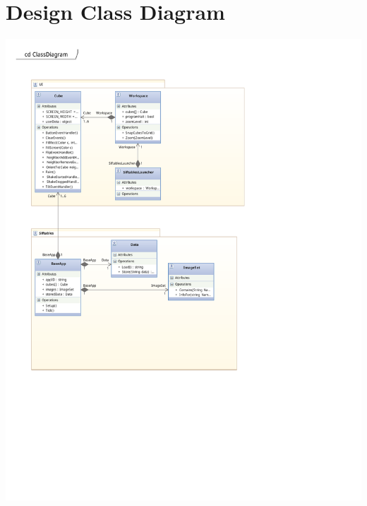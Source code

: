 \documentclass[12pt]{article}
\begin{document}
\section{Design Class Diagram}
\begin{center}
        \includegraphics[scale=1]{./pdfs/Models/Class Diagram.pdf}
\end{center}
\end{document}
